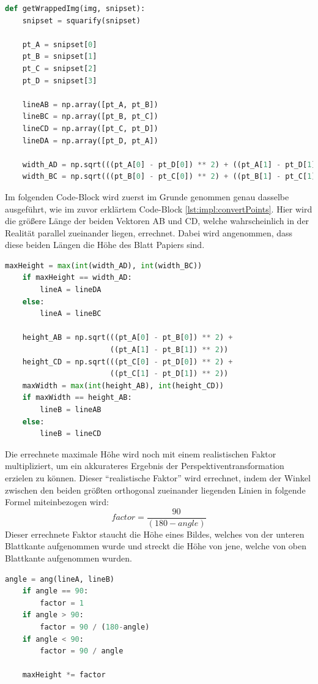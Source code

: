\begin{lstlisting}[caption=Bild in Vogelperspektive umwandeln,language=Python,label=lst:impl:convertPoints]
def getWrappedImg(img, snipset):
    snipset = squarify(snipset)

    pt_A = snipset[0]
    pt_B = snipset[1]
    pt_C = snipset[2]
    pt_D = snipset[3]

    lineAB = np.array([pt_A, pt_B])
    lineBC = np.array([pt_B, pt_C])
    lineCD = np.array([pt_C, pt_D])
    lineDA = np.array([pt_D, pt_A])

    width_AD = np.sqrt(((pt_A[0] - pt_D[0]) ** 2) + ((pt_A[1] - pt_D[1]) ** 2))
    width_BC = np.sqrt(((pt_B[0] - pt_C[0]) ** 2) + ((pt_B[1] - pt_C[1]) ** 2))
\end{lstlisting}
Im folgenden Code-Block wird zuerst im Grunde genommen genau dasselbe ausgeführt, wie im zuvor erklärtem Code-Block \ref{lst:impl:convertPoints}. Hier wird die größere Länge der beiden Vektoren AB und CD, welche wahrscheinlich in der Realität parallel zueinander liegen, errechnet. Dabei wird angenommen, dass diese beiden Längen die Höhe des Blatt Papiers sind.
\begin{lstlisting}[language=Python,label=lst:impl:findBiggestLine,firstnumber=16]
    maxHeight = max(int(width_AD), int(width_BC))
    if maxHeight == width_AD:
        lineA = lineDA
    else:
        lineA = lineBC

    height_AB = np.sqrt(((pt_A[0] - pt_B[0]) ** 2) +
                        ((pt_A[1] - pt_B[1]) ** 2))
    height_CD = np.sqrt(((pt_C[0] - pt_D[0]) ** 2) +
                        ((pt_C[1] - pt_D[1]) ** 2))
    maxWidth = max(int(height_AB), int(height_CD))
    if maxWidth == height_AB:
        lineB = lineAB
    else:
        lineB = lineCD
\end{lstlisting}

Die errechnete maximale Höhe wird noch mit einem realistischen Faktor multipliziert, um ein akkurateres Ergebnis der Perspektiventransformation erzielen zu können. Dieser ``realistische Faktor'' wird errechnet, indem der Winkel zwischen den beiden größten orthogonal zueinander liegenden Linien in folgende Formel miteinbezogen wird:
\[ factor
    = \dfrac{90}{(180-angle)}
\]
Dieser errechnete Faktor staucht die Höhe eines Bildes, welches von der unteren Blattkante aufgenommen wurde und streckt die Höhe von jene, welche von oben Blattkante aufgenommen wurden.


\begin{lstlisting}[language=Python,label=lst:impl:angle,firstnumber=31]
    angle = ang(lineA, lineB)
    if angle == 90:
        factor = 1
    if angle > 90:
        factor = 90 / (180-angle)
    if angle < 90:
        factor = 90 / angle

    maxHeight *= factor
\end{lstlisting}

